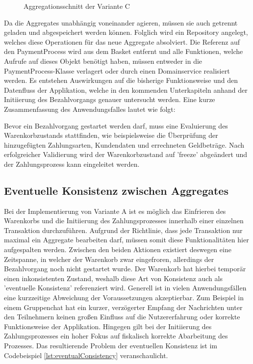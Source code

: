 \begin{figure}[htbp]
	\centering
	
	\caption{Aggregationsschnitt der Variante C}
	\label{fig:VarC}
\end{figure}

Da die Aggregates unabhängig voneinander agieren, müssen sie auch getrennt geladen und abgespeichert werden können. Folglich wird ein Repository angelegt, welches diese Operationen für das neue Aggregate absolviert. Die Referenz auf den PaymentProcess wird aus dem Basket entfernt und alle Funktionen, welche Aufrufe auf dieses Objekt benötigt haben, müssen entweder in die PaymentProcess-Klasse verlagert oder durch einen Domainservice realisiert werden. Es entstehen Auswirkungen auf die bisherige Funktionsweise und den Datenfluss der Applikation, welche in den kommenden Unterkapiteln anhand der Initiierung des Bezahlvorgangs genauer untersucht werden. Eine kurze Zusammenfassung des Anwendungsfalles lautet wie folgt:
 
Bevor ein Bezahlvorgang gestartet werden darf, muss eine Evaluierung des Warenkorbzustands stattfinden, wie beispielsweise die Überprüfung der hinzugefügten Zahlungsarten, Kundendaten und errechneten Geldbeträge. Nach erfolgreicher Validierung wird der Warenkorbzustand auf 'freeze' abgeändert und der Zahlungsprozess kann eingeleitet werden.

\subsection{Eventuelle Konsistenz zwischen Aggregates}

Bei der Implementierung von Variante A ist es möglich das Einfrieren des Warenkorbs und die Initiierung des Zahlungsprozesses innerhalb einer einzelnen Transaktion durchzuführen. Aufgrund der Richtlinie, dass jede Transaktion nur maximal ein Aggregate bearbeiten darf, müssen somit diese Funktionalitäten hier aufgespalten werden. Zwischen den beiden Aktionen existiert deswegen eine Zeitspanne, in welcher der Warenkorb zwar eingefroren, allerdings der Bezahlvorgang noch nicht gestartet wurde. Der Warenkorb hat hierbei temporär einen inkonsistenten Zustand, weshalb diese Art von Konsistenz auch als 'eventuelle Konsistenz' referenziert wird. Generell ist in vielen Anwendungsfällen eine kurzzeitige Abweichung der Voraussetzungen akzeptierbar. Zum Beispiel in einem Gruppenchat hat ein kurzer, verzögerter Empfang der Nachrichten unter den Teilnehmern keinen großen Einfluss auf die Nutzererfahrung oder korrekte Funktionsweise der Applikation. Hingegen gilt bei der Initiierung des Zahlungsprozesses ein hoher Fokus auf fiskalisch korrekte Abarbeitung des Prozesses. Das resultierende Problem der eventuellen Konsistenz ist im Codebeispiel \ref{lst:eventualConsistency} veranschaulicht.

